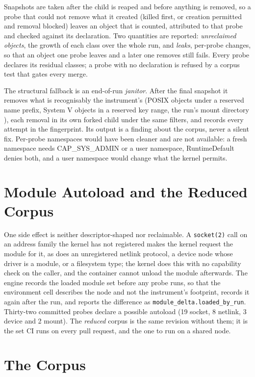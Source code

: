 Snapshots are taken after the child is reaped and before anything is removed, so a probe that could not remove what it created (killed first, or creation permitted and removal blocked) leaves an object that is counted, attributed to that probe and checked against its declaration. Two quantities are reported: \emph{unreclaimed objects}, the growth of each class over the whole run, and \emph{leaks}, per-probe changes, so that an object one probe leaves and a later one removes still fails. Every probe declares its residual classes; a probe with no declaration is refused by a corpus test that gates every merge.

The structural fallback is an end-of-run \emph{janitor}. After the final snapshot it removes what is recognisably the instrument's (POSIX objects under a reserved name prefix, System V objects in a reserved key range, the run's mount directory ), each removal in its own forked child under the same filters, and records every attempt in the fingerprint. Its output is a finding about the corpus, never a silent fix. Per-probe namespaces would have been cleaner and are not available: a fresh namespace needs CAP\_SYS\_ADMIN or a user namespace, RuntimeDefault denies both, and a user namespace would change what the kernel permits.

\section{Module Autoload and the Reduced Corpus}

One side effect is neither descriptor-shaped nor reclaimable. A \texttt{socket(2)} call on an address family the kernel has not registered makes the kernel request the module for it, as does an unregistered netlink protocol, a device node whose driver is a module, or a filesystem type; the kernel does this with no capability check on the caller, and the container cannot unload the module afterwards. The engine records the loaded module set before any probe runs, so that the environment cell describes the node and not the instrument's footprint, records it again after the run, and reports the difference as \texttt{module\_delta.loaded\_by\_run}. Thirty-two committed probes declare a possible autoload (19 socket, 8 netlink, 3 device and 2 mount). The \emph{reduced} corpus is the same revision without them; it is the set CI runs on every pull request, and the one to run on a shared node.

\section{The Corpus}
\label{sec:corpus}

